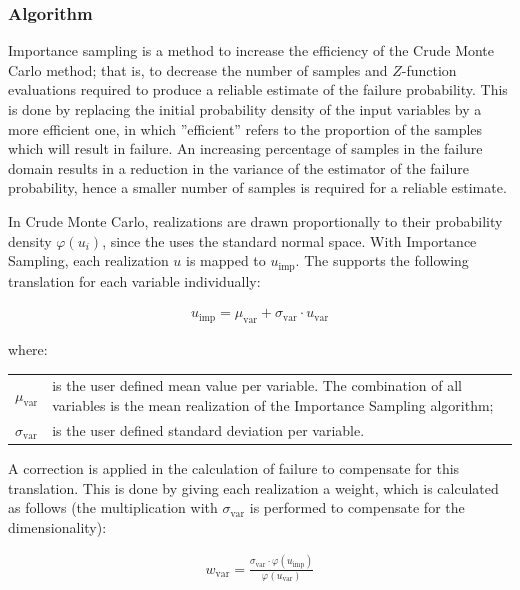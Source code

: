 \subsubsection{Algorithm}
\label{sec:ImportanceSamplingAlgorithm}

Importance sampling is a method to increase the efficiency of the Crude Monte Carlo method; that is, to decrease the number of samples and $Z$-function evaluations required to produce a reliable estimate of the failure probability. This is done by replacing the initial probability density of the input variables by a more efficient one, in which ''efficient'' refers to the proportion of the samples which will result in failure. An increasing percentage of samples in the failure domain results in a reduction in the variance of the estimator of the failure probability, hence a smaller number of samples is required for a reliable estimate. 

In Crude Monte Carlo, realizations are drawn proportionally to their probability density $\varphi\left(u_i\right)$, since the \probLib uses the standard normal space. With Importance Sampling, each realization $u$ is mapped to $u_{\text{imp}}$. The \probLib supports the following translation for each variable individually:

\begin{align} 
\label{eq:ImportanceSamplingVariance}
u_{\text{imp}} = \mu_{\text{var}} + \sigma_{\text{var}} \cdot u_{\text{var}}
\end{align}

where:

\begin{longtable}{p{16mm}p{\textwidth-24pt-16mm}}  
	$\mu_{\text{var}}$ & is the user defined mean value per variable. The combination of all variables is the mean realization of the Importance Sampling algorithm; \\
	$\sigma_{\text{var}}$ & is the user defined standard deviation per variable.
\end{longtable}

A correction is applied in the calculation of failure to compensate for this translation. This is done by giving each realization a weight, which is calculated as follows (the multiplication with $\sigma_{\text{var}}$ is performed to compensate for the dimensionality):

\begin{align} 
\label{eq:ImportanceSamplingVarWeight}
w_{\text{var}} = \frac{\sigma_{\text{var}} \cdot \varphi\left(u_\text{imp}\right)}{\varphi\left(u_{\text{var}}\right)}
\end{align}

